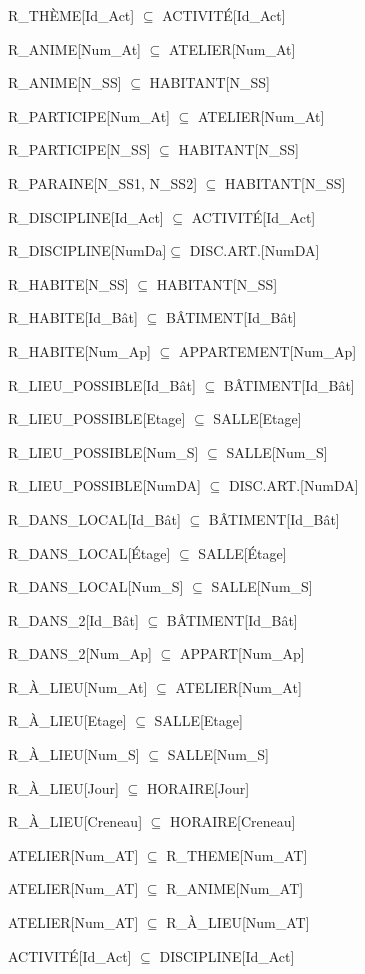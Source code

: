 \documentclass[a4paper,10.5pt]{report}
\begin{document}
	R\_THÈME[Id\_Act] $\subseteq$ ACTIVITÉ[Id\_Act]

	R\_ANIME[Num\_At] $\subseteq$ ATELIER[Num\_At]

	R\_ANIME[N\_SS] $\subseteq$ HABITANT[N\_SS]

	R\_PARTICIPE[Num\_At] $\subseteq$ ATELIER[Num\_At]

	R\_PARTICIPE[N\_SS] $\subseteq$ HABITANT[N\_SS]

	R\_PARAINE[N\_SS1, N\_SS2] $\subseteq$ HABITANT[N\_SS]

	R\_DISCIPLINE[Id\_Act] $\subseteq$ ACTIVITÉ[Id\_Act]

	R\_DISCIPLINE[NumDa]$\subseteq$ DISC.ART.[NumDA]

	R\_HABITE[N\_SS] $\subseteq$ HABITANT[N\_SS]

	R\_HABITE[Id\_Bât] $\subseteq$ BÂTIMENT[Id\_Bât]

	R\_HABITE[Num\_Ap] $\subseteq$ APPARTEMENT[Num\_Ap]

	R\_LIEU\_POSSIBLE[Id\_Bât] $\subseteq$ BÂTIMENT[Id\_Bât]

	R\_LIEU\_POSSIBLE[Etage] $\subseteq$ SALLE[Etage]

	R\_LIEU\_POSSIBLE[Num\_S] $\subseteq$ SALLE[Num\_S]

	R\_LIEU\_POSSIBLE[NumDA] $\subseteq$ DISC.ART.[NumDA]

	R\_DANS\_LOCAL[Id\_Bât] $\subseteq$ BÂTIMENT[Id\_Bât]

	R\_DANS\_LOCAL[Étage] $\subseteq$ SALLE[Étage]

	R\_DANS\_LOCAL[Num\_S] $\subseteq$ SALLE[Num\_S]

	R\_DANS\_2[Id\_Bât] $\subseteq$ BÂTIMENT[Id\_Bât]

	R\_DANS\_2[Num\_Ap] $\subseteq$ APPART[Num\_Ap]

	R\_À\_LIEU[Num\_At] $\subseteq$ ATELIER[Num\_At]

	R\_À\_LIEU[Etage] $\subseteq$ SALLE[Etage]

	R\_À\_LIEU[Num\_S] $\subseteq$ SALLE[Num\_S]

	R\_À\_LIEU[Jour] $\subseteq$ HORAIRE[Jour]

	R\_À\_LIEU[Creneau] $\subseteq$ HORAIRE[Creneau]

	ATELIER[Num\_AT] $\subseteq$ R\_THEME[Num\_AT]

	ATELIER[Num\_AT] $\subseteq$ R\_ANIME[Num\_AT]

	ATELIER[Num\_AT] $\subseteq$ R\_À\_LIEU[Num\_AT]

	ACTIVITÉ[Id\_Act] $\subseteq$ DISCIPLINE[Id\_Act]
\end{document}
